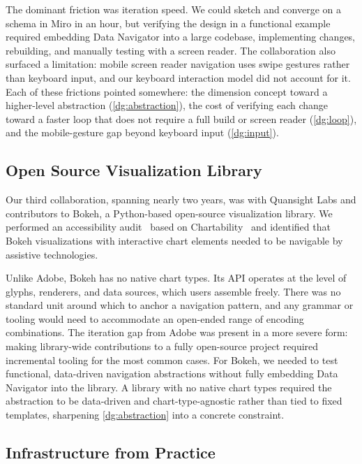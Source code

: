 \documentclass[12pt]{cmuthesis}
\begin{document}
The dominant friction was iteration speed. We could sketch and converge on a schema in Miro in an hour, but verifying the design in a functional example required embedding Data Navigator into a large codebase, implementing changes, rebuilding, and manually testing with a screen reader. The collaboration also surfaced a limitation: mobile screen reader navigation uses swipe gestures rather than keyboard input, and our keyboard interaction model did not account for it. Each of these frictions pointed somewhere: the dimension concept toward a higher-level abstraction (\ref{dg:abstraction}), the cost of verifying each change toward a faster loop that does not require a full build or screen reader (\ref{dg:loop}), and the mobile-gesture gap beyond keyboard input (\ref{dg:input}).

\subsection{Open Source Visualization Library}
\label{sec:opensource}

Our third collaboration, spanning nearly two years, was with Quansight Labs and contributors to Bokeh, a Python-based open-source visualization library. We performed an accessibility audit~\cite{Eswaramoorthy2025BokehAudit} based on Chartability~\cite{Elavsky2022Chartability} and identified that Bokeh visualizations with interactive chart elements needed to be navigable by assistive technologies.

Unlike Adobe, Bokeh has no native chart types. Its API operates at the level of glyphs, renderers, and data sources, which users assemble freely. There was no standard unit around which to anchor a navigation pattern, and any grammar or tooling would need to accommodate an open-ended range of encoding combinations. The iteration gap from Adobe was present in a more severe form: making library-wide contributions to a fully open-source project required incremental tooling for the most common cases. For Bokeh, we needed to test functional, data-driven navigation abstractions without fully embedding Data Navigator into the library. A library with no native chart types required the abstraction to be data-driven and chart-type-agnostic rather than tied to fixed templates, sharpening \ref{dg:abstraction} into a concrete constraint.


\subsection{Infrastructure from Practice}
\label{sec:infrastructure}
\end{document}
